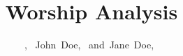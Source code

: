 \documentclass[journal]{IEEEtran}
\begin{document}
%
\title{Worship Analysis}


\author{,~
        John~Doe,~
        and~Jane~Doe,~}

% 

% 
\end{document}
